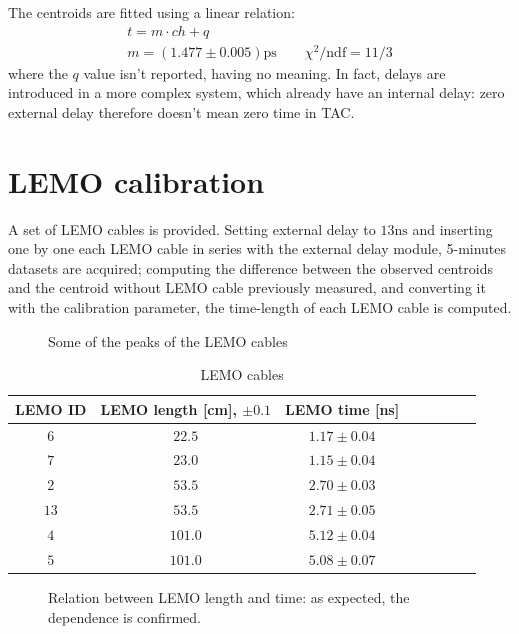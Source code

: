 \documentclass[11pt,a4 paper]{article}
\begin{document}
The centroids are fitted using a linear relation:
\begin{gather*}
    t = m\cdot ch + q \\
    m = (1.477 \pm 0.005) \si{\pico\second} \qquad
    \chi^2/\text{ndf} = 11/3
\end{gather*}
where the $q$ value isn't reported, having no meaning. In fact, delays are introduced in a more complex system, which already have an internal delay: zero external delay therefore doesn't mean zero time in TAC.



\section{LEMO calibration}
A set of LEMO cables is provided. Setting external delay to $13\si{\nano\second}$ and inserting one by one each LEMO cable in series with the external delay module, 5-minutes datasets are acquired; computing the difference between the observed centroids and the centroid without LEMO cable previously measured, and converting it with the calibration parameter, the time-length of each LEMO cable is computed.

\begin{figure}[H]
    \centering
    \caption{Some of the peaks of the LEMO cables}
    \label{fig:lemo}
\end{figure}

\begin{table}[H]
    \centering
    \begin{tabular}{cccccccc}
        \toprule
        LEMO ID & LEMO length [cm], $\pm 0.1$ & LEMO time [ns]\\
        \midrule
        $6$ & $22.5$ & $1.17\pm0.04$\\
        $7$ & $23.0$ & $1.15\pm0.04$\\
        $2$ & $53.5$ & $2.70\pm0.03$\\
        $13$ & $53.5$ & $2.71\pm0.05$\\
        $4$ & $101.0$ & $5.12\pm0.04$\\
        $5$ & $101.0$ & $5.08\pm0.07$\\
        \bottomrule
    \end{tabular}
    \caption{LEMO cables}
    \label{tab:lemo}
\end{table}

\begin{figure}[H]
    \centering
    \caption{Relation between LEMO length and time: as expected, the dependence is confirmed.}
    \label{fig:lemo_length}
\end{figure}
\end{document}
